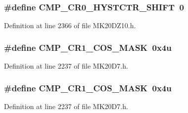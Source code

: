\subsubsection[{\texorpdfstring{C\+M\+P\+\_\+\+C\+R0\+\_\+\+H\+Y\+S\+T\+C\+T\+R\+\_\+\+S\+H\+I\+FT}{CMP_CR0_HYSTCTR_SHIFT}}]{\setlength{\rightskip}{0pt plus 5cm}\#define C\+M\+P\+\_\+\+C\+R0\+\_\+\+H\+Y\+S\+T\+C\+T\+R\+\_\+\+S\+H\+I\+FT~0}\hypertarget{group___c_m_p___register___masks_ga12a965eae39b79d9e6066de9af418df3}{}\label{group___c_m_p___register___masks_ga12a965eae39b79d9e6066de9af418df3}


Definition at line 2366 of file M\+K20\+D\+Z10.\+h.

\subsubsection[{\texorpdfstring{C\+M\+P\+\_\+\+C\+R1\+\_\+\+C\+O\+S\+\_\+\+M\+A\+SK}{CMP_CR1_COS_MASK}}]{\setlength{\rightskip}{0pt plus 5cm}\#define C\+M\+P\+\_\+\+C\+R1\+\_\+\+C\+O\+S\+\_\+\+M\+A\+SK~0x4u}\hypertarget{group___c_m_p___register___masks_gaf8b38740c4bddec386b2b7d674f5f0fc}{}\label{group___c_m_p___register___masks_gaf8b38740c4bddec386b2b7d674f5f0fc}


Definition at line 2237 of file M\+K20\+D7.\+h.

\subsubsection[{\texorpdfstring{C\+M\+P\+\_\+\+C\+R1\+\_\+\+C\+O\+S\+\_\+\+M\+A\+SK}{CMP_CR1_COS_MASK}}]{\setlength{\rightskip}{0pt plus 5cm}\#define C\+M\+P\+\_\+\+C\+R1\+\_\+\+C\+O\+S\+\_\+\+M\+A\+SK~0x4u}\hypertarget{group___c_m_p___register___masks_gaf8b38740c4bddec386b2b7d674f5f0fc}{}\label{group___c_m_p___register___masks_gaf8b38740c4bddec386b2b7d674f5f0fc}


Definition at line 2237 of file M\+K20\+D7.\+h.

